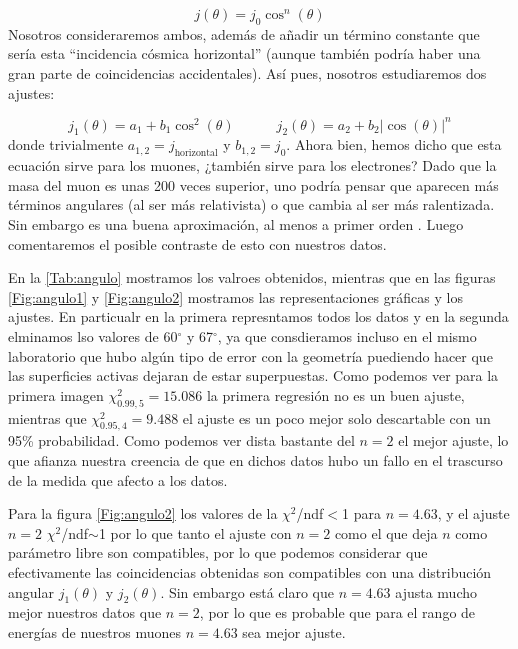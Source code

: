 \documentclass[11pt]{article}
\newcommand{\tquad}{\quad \quad \quad}
\begin{document}
\begin{equation}
	j (\theta) = j_0 \cos^n (\theta)	
\end{equation}
Nosotros consideraremos ambos, además de añadir un término constante que sería esta ``incidencia  cósmica horizontal'' (aunque también podría haber una gran parte de coincidencias accidentales). Así pues, nosotros estudiaremos dos ajustes:

\begin{equation}
	j_1 (\theta) = a_1 + b_1 \cos^2(\theta)	 \tquad 
	j_2 (\theta) = a_2 + b_2 |\cos(\theta)|^n
\end{equation}
donde trivialmente $a_{1,2}=j_{\text{horizontal}}$ y $b_{1,2}=j_0$. Ahora bien, hemos dicho que esta ecuación sirve para los muones, ¿también sirve para los electrones? Dado que la masa del muon es unas 200 veces superior, uno podría pensar que aparecen más términos angulares (al ser más relativista) o que cambia al ser más ralentizada. Sin embargo es una buena aproximación, al menos a primer orden \cite{P2}. Luego comentaremos el posible contraste de esto con nuestros datos. 



En la \cref{Tab:angulo} mostramos los valroes obtenidos, mientras que en las figuras \cref{Fig:angulo1} y \cref{Fig:angulo2} mostramos las representaciones gráficas y los ajustes. En particualr en la primera represntamos todos los datos y en la segunda elminamos lso valores de 60$^\circ$ y 67$^\circ$, ya que consdieramos incluso en el mismo laboratorio que hubo algún tipo de error con la geometría puediendo hacer que las superficies activas dejaran de estar superpuestas. Como podemos ver para la primera imagen $\chi^2_{0.99,5}=15.086$ la primera regresión no es un buen ajuste, mientras que $\chi^2_{0.95,4}=9.488$ el ajuste es un poco mejor solo descartable con un 95\% probabilidad. Como podemos ver dista bastante del $n=2$ el mejor ajuste, lo que afianza nuestra creencia de que en dichos datos hubo un fallo en el trascurso de la medida que afecto a los datos. 

Para la figura \cref{Fig:angulo2} los valores de la $\chi^2$/ndf$<$1 para $n=4.63$, y el ajuste $n=2$ $\chi^2$/ndf$\sim$1 por lo que tanto el ajuste con $n=2$ como el que deja $n$ como parámetro libre son compatibles, por lo que podemos considerar que efectivamente las coincidencias obtenidas son compatibles con una distribución angular $j_1(\theta)$ y $j_2(\theta)$. Sin embargo está claro que $n=4.63$ ajusta mucho mejor nuestros datos que $n=2$, por lo que es probable que para el rango de energías de nuestros muones $n=4.63$ sea mejor ajuste.
\end{document}

